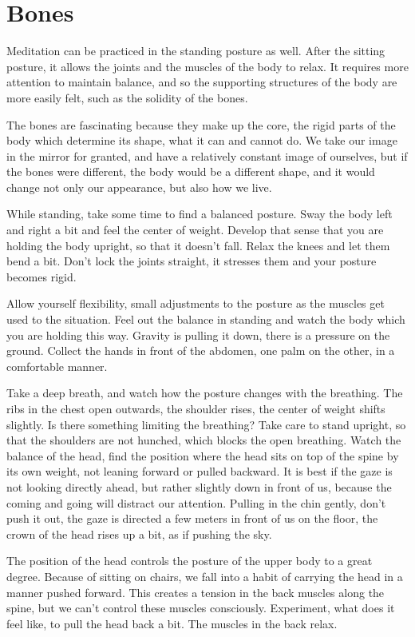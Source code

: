 \hypertarget{bones-1}{%
\chapter{Bones}\label{bones-1}}

Meditation can be practiced in the standing posture as well. After the
sitting posture, it allows the joints and the muscles of the body to
relax. It requires more attention to maintain balance, and so the
supporting structures of the body are more easily felt, such as the
solidity of the bones.

The bones are fascinating because they make up the core, the rigid parts
of the body which determine its shape, what it can and cannot do. We
take our image in the mirror for granted, and have a relatively constant
image of ourselves, but if the bones were different, the body would be a
different shape, and it would change not only our appearance, but also
how we live.

While standing, take some time to find a balanced posture. Sway the body
left and right a bit and feel the center of weight. Develop that sense
that you are holding the body upright, so that it doesn't fall. Relax
the knees and let them bend a bit. Don't lock the joints straight, it
stresses them and your posture becomes rigid.

Allow yourself flexibility, small adjustments to the posture as the
muscles get used to the situation. Feel out the balance in standing and
watch the body which you are holding this way. Gravity is pulling it
down, there is a pressure on the ground. Collect the hands in front of
the abdomen, one palm on the other, in a comfortable manner.

Take a deep breath, and watch how the posture changes with the
breathing. The ribs in the chest open outwards, the shoulder rises, the
center of weight shifts slightly. Is there something limiting the
breathing? Take care to stand upright, so that the shoulders are not
hunched, which blocks the open breathing. Watch the balance of the head,
find the position where the head sits on top of the spine by its own
weight, not leaning forward or pulled backward. It is best if the gaze
is not looking directly ahead, but rather slightly down in front of us,
because the coming and going will distract our attention. Pulling in the
chin gently, don't push it out, the gaze is directed a few meters in
front of us on the floor, the crown of the head rises up a bit, as if
pushing the sky.

The position of the head controls the posture of the upper body to a
great degree. Because of sitting on chairs, we fall into a habit of
carrying the head in a manner pushed forward. This creates a tension in
the back muscles along the spine, but we can't control these muscles
consciously. Experiment, what does it feel like, to pull the head back a
bit. The muscles in the back relax.

